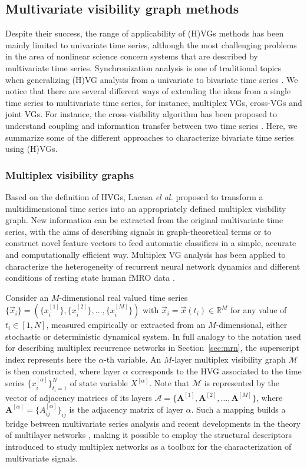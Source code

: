 	\subsection{Multivariate visibility graph methods}
	Despite their success, the range of applicability of (H)VGs methods has been mainly limited to univariate time series, although the most challenging problems in the area of nonlinear science concern systems that are described by multivariate time series. Synchronization analysis is one of traditional topics when generalizing (H)VG analysis from a univariate to bivariate time series \cite{Ahmadlou2012a,Mitra2012}. We notice that there are several different ways of extending the ideas from a single time series to multivariate time series, for instance, multiplex VGs, cross-VGs and joint VGs. For instance, the cross-visibility algorithm has been proposed to understand coupling and information transfer between two time series \cite{Mehraban2013}. Here, we summarize some of the different approaches to characterize bivariate time series using (H)VGs. 
	
		\subsubsection{Multiplex visibility graphs} \label{sec:multiplexVG}
		Based on the definition of HVGs, Lacasa \textit{el al.} \cite{Lacasa2015b} proposed to transform a multidimensional time series into an appropriately defined multiplex visibility graph. New information can be extracted from the original multivariate time series, with the aims of describing signals in graph-theoretical terms or to construct novel feature vectors to feed automatic classifiers in a simple, accurate and computationally efficient way. Multiplex VG analysis has been applied to characterize the heterogeneity of recurrent neural network dynamics \cite{Bianchi2017} and different conditions of resting state human fMRO data \cite{Sannino2017}. 
		
		Consider an $M$-dimensional real valued time series $\{ \vec{x}_i \} = (\{ x_i^{[1]}\}, \{x_i^{[2]} \}, \dots, \{x_i^{[M]} \})$ with $\vec{x}_i = \vec{x}(t_i)  \in \mathbb{R}^M$ for any value of $t_i \in [1, N]$, measured empirically or extracted from an $M$-dimensional, either stochastic or deterministic dynamical system. In full analogy to the notation used for describing multiplex recurrence networks in Section~\ref{sec:mrn}, the superscript index represents here the $\alpha$-th variable. An $M$-layer multiplex visibility graph $\mathcal{M}$ is then constructed, where layer $\alpha$ corresponds to the HVG associated to the time series $\{ x_i^{[\alpha]}\}_{t_i=1}^{N}$ of state variable $X^{[\alpha]}$. Note that $\mathcal{M}$ is represented by the vector of adjacency matrices of its layers $\mathbf{\mathcal{A}} = \{\mathbf{A}^{[1]}, \mathbf{A}^{[2]}, \dots, \mathbf{A}^{[M]}\}$, where $\mathbf{A}^{[\alpha]} = \{A_{ij}^{[\alpha]} \}_{ij}$ is the adjacency matrix of layer $\alpha$. Such a mapping builds a bridge between multivariate series analysis and recent developments in the theory of multilayer networks \cite{Boccaletti2014}, making it possible to employ the structural descriptors introduced to study multiplex networks as a toolbox for the characterization of multivariate signals. 
		

